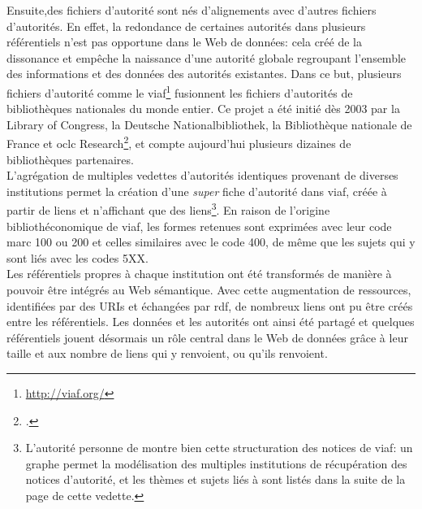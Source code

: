 Ensuite,des fichiers d'autorité sont nés d'alignements avec d'autres fichiers d'autorités. En effet, la redondance de certaines autorités dans plusieurs référentiels n'est pas opportune dans le Web de données: cela créé de la dissonance et empêche la naissance d'une autorité globale regroupant l'ensemble des informations et des données des autorités existantes. Dans ce but, plusieurs fichiers d'autorité comme le \ac{viaf}\footnote{\url{http://viaf.org/}} fusionnent les fichiers d'autorités de bibliothèques nationales du monde entier. Ce projet a été initié dès 2003 par la Library of Congress, la Deutsche Nationalbibliothek, la Bibliothèque nationale de France et \ac{oclc} Research\footcite{bermes_les_2013}, et compte aujourd'hui plusieurs dizaines de bibliothèques partenaires.\\

L'agrégation de multiples vedettes d'autorités identiques provenant de diverses institutions permet la création d'une \textit{super} fiche d'autorité dans \ac{viaf}, créée à partir de liens et n'affichant que des liens\footnote{L'autorité personne de \href{http://viaf.org/viaf/108762210/}{} montre bien cette structuration des notices de \ac{viaf}: un graphe permet la modélisation des multiples institutions de récupération des notices d'autorité, et les thèmes et sujets liés à  sont listés dans la suite de la page de cette vedette.}. En raison de l'origine bibliothéconomique de \ac{viaf}, les formes retenues sont exprimées avec leur code \ac{marc} 100 ou 200 et celles similaires avec le code 400, de même que les sujets qui y sont liés avec les codes 5XX.\\


\bigskip
\bigskip
Les référentiels propres à chaque institution ont été transformés de manière à pouvoir être intégrés au Web sémantique. Avec cette augmentation de ressources, identifiées par des URIs et échangées par \ac{rdf}, de nombreux liens ont pu être créés entre les référentiels. Les données et les autorités ont ainsi été partagé et quelques référentiels jouent désormais un rôle central dans le Web de données grâce à leur taille et aux nombre de liens qui y renvoient, ou qu'ils renvoient.